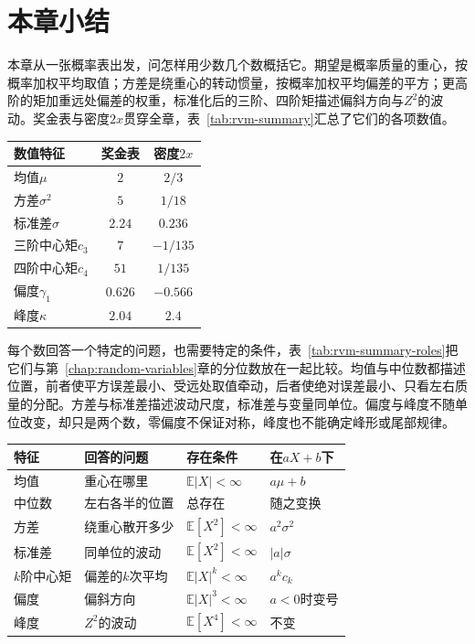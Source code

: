 \section{本章小结}
\label{sec:rvm-summary}

本章从一张概率表出发，问怎样用少数几个数概括它。期望是概率质量的重心，按概率加权平均取值；方差是绕重心的转动惯量，按概率加权平均偏差的平方；更高阶的矩加重远处偏差的权重，标准化后的三阶、四阶矩描述偏斜方向与$Z^{2}$的波动。奖金表与密度$2x$贯穿全章，表~\ref{tab:rvm-summary}汇总了它们的各项数值。

\begin{BookInlineTable}
 \centering
 \caption{两个贯穿例子的数值特征。}
 \label{tab:rvm-summary}
 \begin{tabular}{lcc}
  \toprule
  数值特征 & 奖金表 & 密度$2x$\\
  \midrule
  均值$\mu$ & $2$ & $2/3$\\
  方差$\sigma^{2}$ & $5$ & $1/18$\\
  标准差$\sigma$ & $2.24$ & $0.236$\\
  三阶中心矩$c_3$ & $7$ & $-1/135$\\
  四阶中心矩$c_4$ & $51$ & $1/135$\\
  偏度$\gamma_1$ & $0.626$ & $-0.566$\\
  峰度$\kappa$ & $2.04$ & $2.4$\\
  \bottomrule
 \end{tabular}
\end{BookInlineTable}

每个数回答一个特定的问题，也需要特定的条件，表~\ref{tab:rvm-summary-roles}把它们与第~\ref{chap:random-variables}章的分位数放在一起比较。均值与中位数都描述位置，前者使平方误差最小、受远处取值牵动，后者使绝对误差最小、只看左右质量的分配。方差与标准差描述波动尺度，标准差与变量同单位。偏度与峰度不随单位改变，却只是两个数，零偏度不保证对称，峰度也不能确定峰形或尾部规律。

\begin{BookInlineTable}
 \centering
 \caption{各数值特征回答的问题、存在条件与在$aX+b$（$a\neq0$）下的变化。偏度与峰度还要求$\sigma>0$。}
 \label{tab:rvm-summary-roles}
 \begin{tabular}{llll}
  \toprule
  特征 & 回答的问题 & 存在条件 & 在$aX+b$下\\
  \midrule
  均值 & 重心在哪里 & $\mathbb{E}\lvert X\rvert<\infty$ & $a\mu+b$\\
  中位数 & 左右各半的位置 & 总存在 & 随之变换\\
  方差 & 绕重心散开多少 & $\mathbb{E}[X^{2}]<\infty$ & $a^{2}\sigma^{2}$\\
  标准差 & 同单位的波动 & $\mathbb{E}[X^{2}]<\infty$ & $\lvert a\rvert\sigma$\\
  $k$阶中心矩 & 偏差的$k$次平均 & $\mathbb{E}\lvert X\rvert^{k}<\infty$ & $a^{k}c_k$\\
  偏度 & 偏斜方向 & $\mathbb{E}\lvert X\rvert^{3}<\infty$ & $a<0$时变号\\
  峰度 & $Z^{2}$的波动 & $\mathbb{E}[X^{4}]<\infty$ & 不变\\
  \bottomrule
 \end{tabular}
\end{BookInlineTable}

